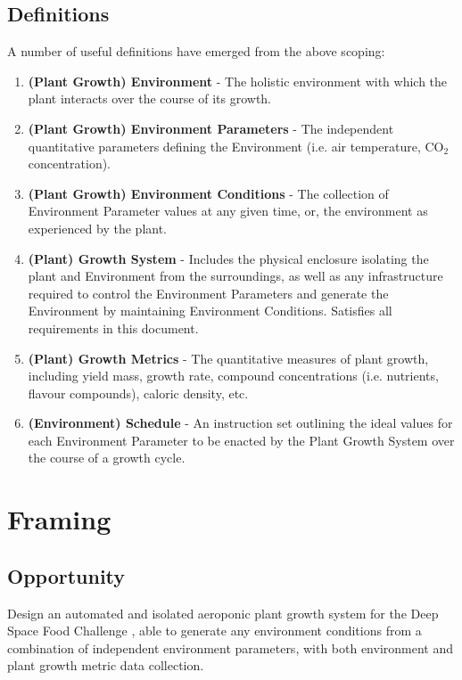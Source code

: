 \documentclass{../tex/report}
\begin{document}
\clearpage
\subsection{Definitions}
\label{sec:definitions}

A number of useful definitions have emerged from the above scoping:
\begin{enumerate}
    \item \textbf{(Plant Growth) Environment} - The holistic environment with which the plant interacts over the course of its growth.
    \item \textbf{(Plant Growth) Environment Parameters} - The independent quantitative parameters defining the Environment (i.e. air temperature, CO${}_2$ concentration).
    \item \textbf{(Plant Growth) Environment Conditions} - The collection of Environment Parameter values at any given time, or, the environment as experienced by the plant.
    \item \textbf{(Plant) Growth System} - Includes the physical enclosure isolating the plant and Environment from the surroundings, as well as any infrastructure required to control the Environment Parameters and generate the Environment by maintaining Environment Conditions. Satisfies all requirements in this document.
    \item \textbf{(Plant) Growth Metrics} - The quantitative measures of plant growth, including yield mass, growth rate, compound concentrations (i.e. nutrients, flavour compounds), caloric density, etc.
    \item \textbf{(Environment) Schedule} - An instruction set outlining the ideal values for each Environment Parameter to be enacted by the Plant Growth System over the course of a growth cycle.
\end{enumerate}

\clearpage
\section{Framing}
\label{sec:framing}

\subsection{Opportunity}
\label{sec:opportunity}

Design an automated and isolated aeroponic plant growth system for the Deep Space Food Challenge \cite{dsfc}, able to generate any environment conditions from a combination of independent environment parameters, with both environment and plant growth metric data collection.
\end{document}
